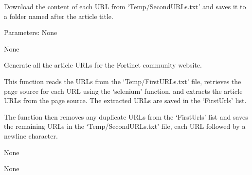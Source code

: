 \documentclass[letterpaper,10pt,english]{sphinxmanual}
\begin{document}
\begin{fulllineitems}
\label{\detokenize{Project.Script:Project.Script.RecupKbFortinet.curlAllArticles}}
\pysigstartsignatures
{}
\pysigstopsignatures
\sphinxAtStartPar
Download the content of each URL from ‘Temp/SecondURLs.txt’ and saves it to a folder named after the article title.

\sphinxAtStartPar
Parameters:
None
\begin{description}
\sphinxAtStartPar
None

\end{description}

\end{fulllineitems}


\begin{fulllineitems}
\label{\detokenize{Project.Script:Project.Script.RecupKbFortinet.generateAllArticleUrls}}
\pysigstartsignatures
{}
\pysigstopsignatures
\sphinxAtStartPar
Generate all the article URLs for the Fortinet community website.

\sphinxAtStartPar
This function reads the URLs from the ‘Temp/FirstURLs.txt’ file, retrieves the page source for each URL using the ‘selenium’ function,
and extracts the article URLs from the page source. The extracted URLs are saved in the ‘FirstUrls’ list.

\sphinxAtStartPar
The function then removes any duplicate URLs from the ‘FirstUrls’ list and saves the remaining URLs in the ‘Temp/SecondURLs.txt’ file,
each URL followed by a newline character.
\begin{description}
\sphinxAtStartPar
None

\sphinxAtStartPar
None

\end{description}

\end{fulllineitems}

\end{document}
